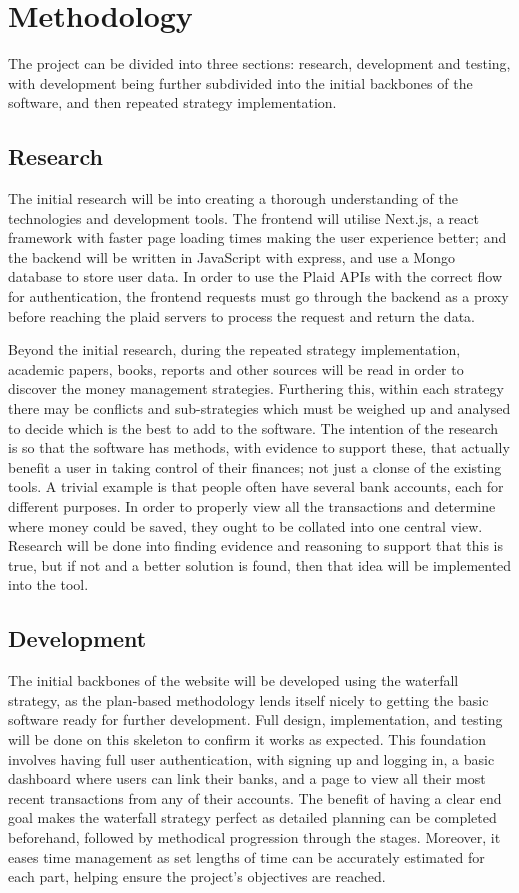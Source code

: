 \section{Methodology}
The project can be divided into three sections: research, development and testing, with development being further subdivided into the initial backbones of the software, and then repeated strategy implementation.


\subsection{Research}
The initial research will be into creating a thorough understanding of the technologies and development tools. The frontend will utilise Next.js, a react framework with faster page loading times making the user experience better; and the backend will be written in JavaScript with express, and use a Mongo database to store user data. In order to use the Plaid APIs with the correct flow for authentication, the frontend requests must go through the backend as a proxy before reaching the plaid servers to process the request and return the data. 

Beyond the initial research, during the repeated strategy implementation, academic papers, books, reports and other sources will be read in order to discover the money management strategies. Furthering this, within each strategy there may be conflicts and sub-strategies which must be weighed up and analysed to decide which is the best to add to the software. The intention of the research is so that the software has methods, with evidence to support these, that actually benefit a user in taking control of their finances; not just a clonse of the existing tools. A trivial example is that people often have several bank accounts, each for different purposes. In order to properly view all the transactions and determine where money could be saved, they ought to be collated into one central view. Research will be done into finding evidence and reasoning to support that this is true, but if not and a better solution is found, then that idea will be implemented into the tool.

\subsection{Development}
The initial backbones of the website will be developed using the waterfall strategy, as the plan-based methodology lends itself nicely to getting the basic software ready for further development. Full design, implementation, and testing will be done on this skeleton to confirm it works as expected. This foundation involves having full user authentication, with signing up and logging in, a basic dashboard where users can link their banks, and a page to view all their most recent transactions from any of their accounts. The benefit of having a clear end goal makes the waterfall strategy perfect as detailed planning can be completed beforehand, followed by methodical progression through the stages. Moreover, it eases time management as set lengths of time can be accurately estimated for each part, helping ensure the project's objectives are reached.

